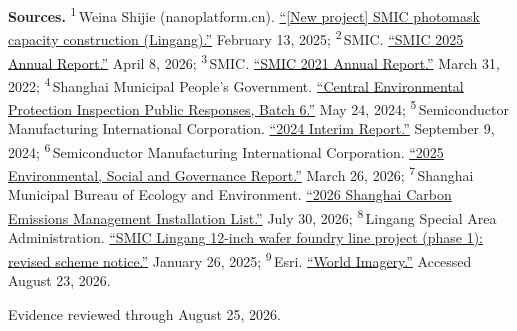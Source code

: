\begin{minipage}[t][0.90\textheight][t]{\textwidth}
{\sffamily\scriptsize\setlength{\emergencystretch}{1.5em}\textbf{Sources.} \textsuperscript{1}\,Weina Shijie (nanoplatform.cn). \href{\detokenize{https://nanoplatform.cn/new/14147/}}{\enquote{[New project] SMIC photomask capacity construction (Lingang).}} February 13, 2025; \textsuperscript{2}\,SMIC. \href{\detokenize{https://www1.hkexnews.hk/listedco/listconews/sehk/2026/0408/2026040801181.pdf}}{\enquote{SMIC 2025 Annual Report.}} April 8, 2026; \textsuperscript{3}\,SMIC. \href{\detokenize{https://www.smics.com/uploads/e00981-2.pdf}}{\enquote{SMIC 2021 Annual Report.}} March 31, 2022; \textsuperscript{4}\,Shanghai Municipal People's Government. \href{\detokenize{https://www.shanghai.gov.cn/cmsres/6d/6df100454e5b422c9d63debfb083e207/527c28010761042fca1e1399a563b159.pdf}}{\enquote{Central Environmental Protection Inspection Public Responses, Batch 6.}} May 24, 2024; \textsuperscript{5}\,Semiconductor Manufacturing International Corporation. \href{\detokenize{https://www.hkexnews.hk/listedco/listconews/sehk/2024/0909/2024090900336.pdf}}{\enquote{2024 Interim Report.}} September 9, 2024; \textsuperscript{6}\,Semiconductor Manufacturing International Corporation. \href{\detokenize{https://www1.hkexnews.hk/listedco/listconews/sehk/2026/0326/2026032601632.pdf}}{\enquote{2025 Environmental, Social and Governance Report.}} March 26, 2026; \textsuperscript{7}\,Shanghai Municipal Bureau of Ecology and Environment. \href{\detokenize{https://sthj.sh.gov.cn/cmsres/34/34b6bc53323247249b6626a63bd9bd43/b0659a953a0f413aa1c8846fd40f53ea.pdf}}{\enquote{2026 Shanghai Carbon Emissions Management Installation List.}} July 30, 2026; \textsuperscript{8}\,Lingang Special Area Administration. \href{\detokenize{https://www.lingang.gov.cn/html/website/lg/index/government/gonggaogongshi/guihuagongshi/1883346289701220354.html}}{\enquote{SMIC Lingang 12-inch wafer foundry line project (phase 1): revised scheme notice.}} January 26, 2025; \textsuperscript{9}\,Esri. \href{\detokenize{https://www.arcgis.com/home/item.html?id=10df2279f9684e4a9f6a7f08febac2a9}}{\enquote{World Imagery.}} Accessed August 23, 2026.\par}
\vfill
\noindent{\color{hairline}\rule{\linewidth}{0.4pt}}\par\smallskip
{\sffamily\scriptsize\color{black!58} Evidence reviewed through August 25, 2026.\par}
\end{minipage}
\clearpage
